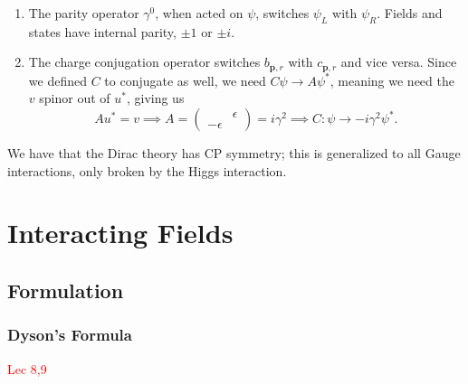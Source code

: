 \documentclass{article}
\begin{document}
\begin{enumerate}[label=(\alph*)]
    \item The parity operator $\gamma^0$, when acted on $\psi$, switches $\psi_L$ with $\psi_R$. Fields and states have internal parity, $\pm 1$ or $\pm i$. 
    \item The charge conjugation operator switches $b_{\mathbf p,r}$ with $c_{\mathbf p,r}$ and vice versa. Since we defined $C$ to conjugate as well, we need $C\psi\to A\psi^*$, meaning we need the $v$ spinor out of $u^*$, giving us
    \begin{equation}
        Au^*=v\implies A=\begin{pmatrix}&\epsilon\\-\epsilon\end{pmatrix}=i\gamma^2\implies C:\psi\to-i\gamma^2\psi^*.
    \end{equation}
\end{enumerate}

We have that the Dirac theory has CP symmetry; this is generalized to all Gauge interactions, only broken by the Higgs interaction.

\pagebreak

\section{Interacting Fields}
\subsection{Formulation}
\subsubsection{Dyson's Formula}
\textcolor{red}{Lec 8,9}
\end{document}

